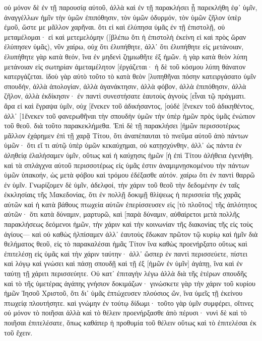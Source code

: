 οὐ μόνον δὲ ἐν τῇ παρουσίᾳ αὐτοῦ, ἀλλὰ καὶ ἐν τῇ παρακλήσει ᾗ παρεκλήθη ἐφ᾽ ὑμῖν, ἀναγγέλλων ἡμῖν τὴν ὑμῶν ἐπιπόθησιν, τὸν ὑμῶν ὀδυρμόν, τὸν ὑμῶν ζῆλον ὑπὲρ ἐμοῦ, ὥστε με μᾶλλον χαρῆναι. 
ὅτι εἰ καὶ ἐλύπησα ὑμᾶς ἐν τῇ ἐπιστολῇ, οὐ μεταμέλομαι· εἰ καὶ μετεμελόμην ([βλέπω ὅτι ἡ ἐπιστολὴ ἐκείνη εἰ καὶ πρὸς ὥραν ἐλύπησεν ὑμᾶς), 
νῦν χαίρω, οὐχ ὅτι ἐλυπήθητε, ἀλλ᾽ ὅτι ἐλυπήθητε εἰς μετάνοιαν, ἐλυπήθητε γὰρ κατὰ θεόν, ἵνα ἐν μηδενὶ ζημιωθῆτε ἐξ ἡμῶν. 
ἡ γὰρ κατὰ θεὸν λύπη μετάνοιαν εἰς σωτηρίαν ἀμεταμέλητον [ἐργάζεται· ἡ δὲ τοῦ κόσμου λύπη θάνατον κατεργάζεται. 
ἰδοὺ γὰρ αὐτὸ τοῦτο τὸ κατὰ θεὸν [λυπηθῆναι πόσην κατειργάσατο ὑμῖν σπουδήν, ἀλλὰ ἀπολογίαν, ἀλλὰ ἀγανάκτησιν, ἀλλὰ φόβον, ἀλλὰ ἐπιπόθησιν, ἀλλὰ ζῆλον, ἀλλὰ ἐκδίκησιν· ἐν παντὶ συνεστήσατε ἑαυτοὺς ἁγνοὺς [εἶναι τῷ πράγματι. 
ἄρα εἰ καὶ ἔγραψα ὑμῖν, οὐχ [ἕνεκεν τοῦ ἀδικήσαντος, [οὐδὲ [ἕνεκεν τοῦ ἀδικηθέντος, ἀλλ᾽ [1ἕνεκεν τοῦ φανερωθῆναι τὴν σπουδὴν ὑμῶν τὴν ὑπὲρ ἡμῶν πρὸς ὑμᾶς ἐνώπιον τοῦ θεοῦ. 
διὰ τοῦτο παρακεκλήμεθα. Ἐπὶ δὲ τῇ παρακλήσει [ἡμῶν περισσοτέρως μᾶλλον ἐχάρημεν ἐπὶ τῇ χαρᾷ Τίτου, ὅτι ἀναπέπαυται τὸ πνεῦμα αὐτοῦ ἀπὸ πάντων ὑμῶν· 
ὅτι εἴ τι αὐτῷ ὑπὲρ ὑμῶν κεκαύχημαι, οὐ κατῃσχύνθην, ἀλλ᾽ ὡς πάντα ἐν ἀληθείᾳ ἐλαλήσαμεν ὑμῖν, οὕτως καὶ ἡ καύχησις ἡμῶν [ἡ ἐπὶ Τίτου ἀλήθεια ἐγενήθη. 
καὶ τὰ σπλάγχνα αὐτοῦ περισσοτέρως εἰς ὑμᾶς ἐστιν ἀναμιμνῃσκομένου τὴν πάντων ὑμῶν ὑπακοήν, ὡς μετὰ φόβου καὶ τρόμου ἐδέξασθε αὐτόν. 
χαίρω ὅτι ἐν παντὶ θαρρῶ ἐν ὑμῖν. 
Γνωρίζομεν δὲ ὑμῖν, ἀδελφοί, τὴν χάριν τοῦ θεοῦ τὴν δεδομένην ἐν ταῖς ἐκκλησίαις τῆς Μακεδονίας, 
ὅτι ἐν πολλῇ δοκιμῇ θλίψεως ἡ περισσεία τῆς χαρᾶς αὐτῶν καὶ ἡ κατὰ βάθους πτωχεία αὐτῶν ἐπερίσσευσεν εἰς [τὸ πλοῦτος] τῆς ἁπλότητος αὐτῶν· 
ὅτι κατὰ δύναμιν, μαρτυρῶ, καὶ [παρὰ δύναμιν, αὐθαίρετοι 
μετὰ πολλῆς παρακλήσεως δεόμενοι ἡμῶν, τὴν χάριν καὶ τὴν κοινωνίαν τῆς διακονίας τῆς εἰς τοὺς ἁγίους— 
καὶ οὐ καθὼς ἠλπίσαμεν ἀλλ᾽ ἑαυτοὺς ἔδωκαν πρῶτον τῷ κυρίῳ καὶ ἡμῖν διὰ θελήματος θεοῦ, 
εἰς τὸ παρακαλέσαι ἡμᾶς Τίτον ἵνα καθὼς προενήρξατο οὕτως καὶ ἐπιτελέσῃ εἰς ὑμᾶς καὶ τὴν χάριν ταύτην· 
ἀλλ᾽ ὥσπερ ἐν παντὶ περισσεύετε, πίστει καὶ λόγῳ καὶ γνώσει καὶ πάσῃ σπουδῇ καὶ τῇ ἐξ [ἡμῶν ἐν ὑμῖν] ἀγάπῃ, ἵνα καὶ ἐν ταύτῃ τῇ χάριτι περισσεύητε. 
Οὐ κατ᾽ ἐπιταγὴν λέγω ἀλλὰ διὰ τῆς ἑτέρων σπουδῆς καὶ τὸ τῆς ὑμετέρας ἀγάπης γνήσιον δοκιμάζων· 
γινώσκετε γὰρ τὴν χάριν τοῦ κυρίου ἡμῶν Ἰησοῦ Χριστοῦ, ὅτι δι᾽ ὑμᾶς ἐπτώχευσεν πλούσιος ὤν, ἵνα ὑμεῖς τῇ ἐκείνου πτωχείᾳ πλουτήσητε. 
καὶ γνώμην ἐν τούτῳ δίδωμι· τοῦτο γὰρ ὑμῖν συμφέρει, οἵτινες οὐ μόνον τὸ ποιῆσαι ἀλλὰ καὶ τὸ θέλειν προενήρξασθε ἀπὸ πέρυσι· 
νυνὶ δὲ καὶ τὸ ποιῆσαι ἐπιτελέσατε, ὅπως καθάπερ ἡ προθυμία τοῦ θέλειν οὕτως καὶ τὸ ἐπιτελέσαι ἐκ τοῦ ἔχειν. 

